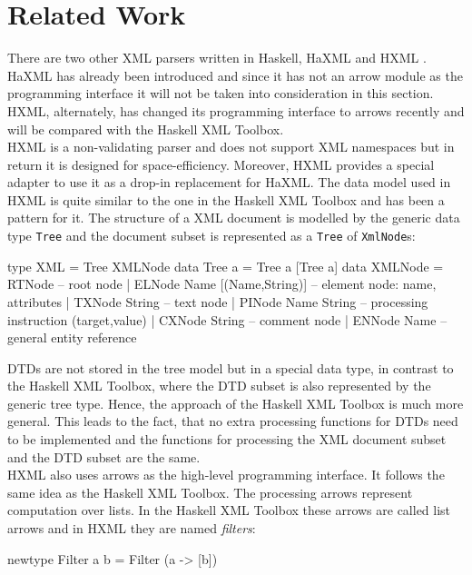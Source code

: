 \documentclass[11pt,a4paper,headsepline, bibtotoc]{scrreprt}
\begin{document}
\section{Related Work}
There are two other XML parsers written in Haskell, HaXML \cite{HaXML} and HXML \cite{HXML}. HaXML has already been introduced and since it has not an arrow module as the programming interface it will not be taken into consideration in this section. HXML, alternately, has changed its programming interface to arrows recently and will be compared with the Haskell XML Toolbox.\\
HXML is a non-validating parser and does not support XML namespaces but in return it is designed for space-efficiency. Moreover, HXML provides a special adapter to use it as a drop-in replacement for HaXML. The data model used in HXML is quite similar to the one in the Haskell XML Toolbox and has been a pattern for it. The structure of a XML document is modelled by the generic data type \texttt{Tree} and the document subset is represented as a \texttt{Tree} of \texttt{XmlNode}s:
\begin{code}[basicstyle=\ttfamily\small]
type XML     = Tree XMLNode
data Tree a  = Tree a [Tree a]
data XMLNode =
    RTNode                      -- root node
  | ELNode Name [(Name,String)] -- element node: name, attributes
  | TXNode String               -- text node
  | PINode Name String          -- processing instruction (target,value)
  | CXNode String               -- comment node
  | ENNode Name                 -- general entity reference 
\end{code}
DTDs are not stored in the tree model but in a special data type, in contrast to the Haskell XML Toolbox, where the DTD subset is also represented by the generic tree type. Hence, the approach of the Haskell XML Toolbox is much more general. This leads to the fact, that no extra processing functions for DTDs need to be implemented and the functions for processing the XML document subset and the DTD subset are the same.\\
HXML also uses arrows as the high-level programming interface. It follows the same idea as the Haskell XML Toolbox. The processing arrows represent computation over lists. In the Haskell XML Toolbox these arrows are called list arrows and in HXML they are named \textit{filters}:
\begin{code}
newtype Filter a b = Filter (a -> [b])
\end{code} 
\end{document}
